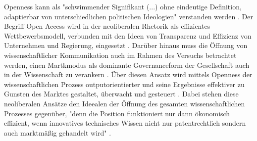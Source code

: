 Openness kann als "schwimmender Signifikant (...) ohne eindeutige Definition, adaptierbar von unterschiedlichen politischen Ideologien" verstanden werden \cite{Adema_2014}. Der Begriff Open Access wird in der neoliberalen Rhetorik als effizientes Wettbewerbsmodell, verbunden mit den Ideen von Transparenz und Effizienz von Unternehmen und Regierung, eingesetzt \cite{Tkacz_2012}. Darüber hinaus muss die Öffnung von wissenschaftlicher Kommunikation auch im Rahmen des Versuchs betrachtet werden, einen Martkmodus als dominante Governanceform der Gesellschaft auch in der Wissenschaft zu verankern \cite[:152]{Troy_2012}. Über diesen Ansatz wird mittels Openness der wissenschaftlichen Prozess outputorientierter und seine Ergebnisse effektiver zu Gunsten des Marktes gestaltet, überwacht und gesteuert \cite{Adema_2010}. Dabei stehen diese neoliberalen Ansätze den Ideealen der Öffnung des gesamten wissenschaftlichen Prozesses gegenüber, "denn die Position funktioniert nur dann ökonomisch effizient, wenn innovatives technisches Wissen nicht nur patentrechtlich sondern auch marktmäßig gehandelt wird" \cite[:179]{Troy_2012}.

